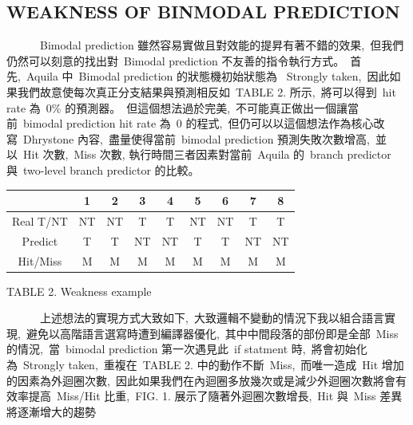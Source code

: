 \documentclass{article}
\begin{document}
\begin{CJK*}{UTF8}{bsmi}
\begin{multicols}{2}
\columnbreak

\begin{center}
    \section*{WEAKNESS OF BINMODAL PREDICTION}
\end{center}

\begin{flushleft}
    \ \ \ \ \ \ Bimodal prediction 雖然容易實做且對效能的提昇有著不錯的效果,\
    但我們仍然可以刻意的找出對\ Bimodal prediction 不友善的指令執行方式。\
    首先,\ Aquila 中\ Bimodal prediction 的狀態機初始狀態為 \ Strongly taken,\
    因此如果我們故意使每次真正分支結果與預測相反如\ TABLE 2. 所示,\
    將可以得到\ hit rate 為\ 0\% 的預測器。\
    但這個想法過於完美,\
    不可能真正做出一個讓當前\ bimodal prediction hit rate 為\ 0 的程式,\
    但仍可以以這個想法作為核心改寫\ Dhrystone 內容,\
    盡量使得當前\ bimodal prediction 預測失敗次數增高,\
    並以\ Hit 次數,\ Miss 次數, 執行時間三者因素對當前\ Aquila 的\ branch predictor 與\ two-level branch predictor 的比較。\
\end{flushleft}

\begin{flushleft}
\begin{tabular}{||c c c c c c c c c||} 
    \hline
     & 1 & 2 & 3 & 4 & 5 & 6 & 7 & 8 \\ [1.5ex] 
    \hline\hline
    Real T/NT &  NT & NT & T & T & NT & NT & T & T  \\ 
    \hline
    Predict  &  T & T & NT & NT & T & T & NT & NT  \\ 
    \hline
    Hit/Miss & M & M & M & M & M  & M & M & M \\
    \hline
\end{tabular}
\end{flushleft}

\begin{center}
    \small{TABLE 2. Weakness example}\\
\end{center}

\begin{flushleft}
    \ \ \ \ \ \ 上述想法的實現方式大致如下,\
    大致邏輯不變動的情況下我以組合語言實現,\
    避免以高階語言選寫時遭到編譯器優化,\
    其中中間段落的部份即是全部\ Miss 的情況,\
    當\ bimodal prediction 第一次遇見此\ if statment 時,\
    將會初始化為\ Strongly taken,\
    重複在\ TABLE 2. 中的動作不斷\ Miss,\
    而唯一造成\ Hit 增加的因素為外迴圈次數,\
    因此如果我們在內迴圈多放幾次或是減少外迴圈次數將會有效率提高\ Miss/Hit 比重,\
    FIG. 1. 展示了隨著外迴圈次數增長,\ Hit 與\ Miss 差異將逐漸增大的趨勢
\end{flushleft}


\end{multicols}
\end{CJK*}
\end{document}

